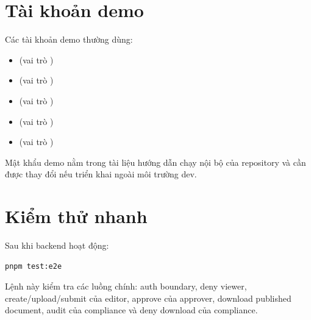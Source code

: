 \section{Tài khoản demo}

Các tài khoản demo thường dùng:

\begin{itemize}
  \item {} (vai trò )
  \item {} (vai trò )
  \item {} (vai trò )
  \item {} (vai trò )
  \item {} (vai trò )
\end{itemize}

Mật khẩu demo nằm trong tài liệu hướng dẫn chạy nội bộ của repository và cần được thay đổi nếu triển khai ngoài môi trường dev.

\section{Kiểm thử nhanh}

Sau khi backend hoạt động:

\begin{lstlisting}[language=bash]
pnpm test:e2e
\end{lstlisting}

Lệnh này kiểm tra các luồng chính: auth boundary, deny viewer, create/upload/submit của editor, approve của approver, download published document, audit của compliance và deny download của compliance.
